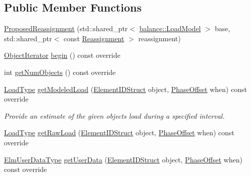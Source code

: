 \subsection*{Public Member Functions}
\begin{DoxyCompactItemize}
\item 
\hyperlink{structvt_1_1vrt_1_1collection_1_1balance_1_1_proposed_reassignment_a8c678464bec1fa46e24c69be66a45220}{Proposed\+Reassignment} (std\+::shared\+\_\+ptr$<$ \hyperlink{structvt_1_1vrt_1_1collection_1_1balance_1_1_load_model}{balance\+::\+Load\+Model} $>$ base, std\+::shared\+\_\+ptr$<$ const \hyperlink{structvt_1_1vrt_1_1collection_1_1balance_1_1_reassignment}{Reassignment} $>$ reassignment)
\item 
\hyperlink{structvt_1_1vrt_1_1collection_1_1balance_1_1_object_iterator}{Object\+Iterator} \hyperlink{structvt_1_1vrt_1_1collection_1_1balance_1_1_proposed_reassignment_ad7a65c6be802368df458f6005ef69d23}{begin} () const override
\item 
int \hyperlink{structvt_1_1vrt_1_1collection_1_1balance_1_1_proposed_reassignment_a7134943ece9dc9a0d4539536f60eed6e}{get\+Num\+Objects} () const override
\item 
\hyperlink{namespacevt_a8fb51741340b87d7aaee0bef60e9896b}{Load\+Type} \hyperlink{structvt_1_1vrt_1_1collection_1_1balance_1_1_proposed_reassignment_abcf28c3b1ffb8b28bed55c28d8d887a4}{get\+Modeled\+Load} (\hyperlink{namespacevt_1_1vrt_1_1collection_1_1balance_a9f5b53fafb270212279a4757d2c4cd28}{Element\+I\+D\+Struct} object, \hyperlink{structvt_1_1vrt_1_1collection_1_1balance_1_1_phase_offset}{Phase\+Offset} when) const override
\begin{DoxyCompactList}\small\item\em Provide an estimate of the given object\textquotesingle{}s load during a specified interval. \end{DoxyCompactList}\item 
\hyperlink{namespacevt_a8fb51741340b87d7aaee0bef60e9896b}{Load\+Type} \hyperlink{structvt_1_1vrt_1_1collection_1_1balance_1_1_proposed_reassignment_a7eeaea5e4a91b02e143d66eba12eaeff}{get\+Raw\+Load} (\hyperlink{namespacevt_1_1vrt_1_1collection_1_1balance_a9f5b53fafb270212279a4757d2c4cd28}{Element\+I\+D\+Struct} object, \hyperlink{structvt_1_1vrt_1_1collection_1_1balance_1_1_phase_offset}{Phase\+Offset} when) const override
\item 
\hyperlink{namespacevt_1_1vrt_1_1collection_1_1balance_abf9eea0f4c24e41036ab844025e7d4c8}{Elm\+User\+Data\+Type} \hyperlink{structvt_1_1vrt_1_1collection_1_1balance_1_1_proposed_reassignment_a30fea286c8e72b3b4533c5b384179ce4}{get\+User\+Data} (\hyperlink{namespacevt_1_1vrt_1_1collection_1_1balance_a9f5b53fafb270212279a4757d2c4cd28}{Element\+I\+D\+Struct} object, \hyperlink{structvt_1_1vrt_1_1collection_1_1balance_1_1_phase_offset}{Phase\+Offset} when) const override
\end{DoxyCompactItemize}

